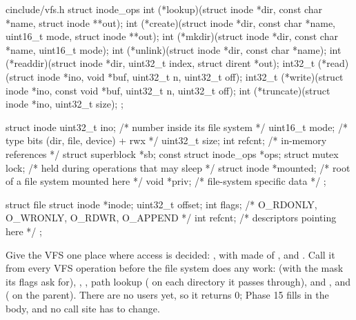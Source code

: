 \documentclass[11pt,a4paper]{article}
\begin{document}
\begin{lst}{c}{include/vfs.h}
struct inode_ops {
    int     (*lookup)(struct inode *dir, const char *name, struct inode **out);
    int     (*create)(struct inode *dir, const char *name, uint16_t mode, struct inode **out);
    int     (*mkdir)(struct inode *dir, const char *name, uint16_t mode);
    int     (*unlink)(struct inode *dir, const char *name);
    int     (*readdir)(struct inode *dir, uint32_t index, struct dirent *out);
    int32_t (*read)(struct inode *ino, void *buf, uint32_t n, uint32_t off);
    int32_t (*write)(struct inode *ino, const void *buf, uint32_t n, uint32_t off);
    int     (*truncate)(struct inode *ino, uint32_t size);
};

struct inode {
    uint32_t                ino;        /* number inside its file system        */
    uint16_t                mode;       /* type bits (dir, file, device) + rwx  */
    uint32_t                size;
    int                     refcnt;     /* in-memory references                 */
    struct superblock      *sb;
    const struct inode_ops *ops;
    struct mutex            lock;       /* held during operations that may sleep */
    struct inode           *mounted;    /* root of a file system mounted here   */
    void                   *priv;       /* file-system specific data            */
};

struct file {
    struct inode *inode;
    uint32_t      offset;
    int           flags;                /* O_RDONLY, O_WRONLY, O_RDWR, O_APPEND */
    int           refcnt;               /* descriptors pointing here            */
};
\end{lst}
Give the VFS one place where access is decided: , with
 made of ,  and . Call it from every VFS operation before
the file system does any work:  (with the mask its flags ask for), , , path
lookup ( on each directory it passes through), and ,  and  (
on the parent). There are no users yet, so it returns 0; Phase 15 fills in the body, and no call site has to change.
\end{document}
